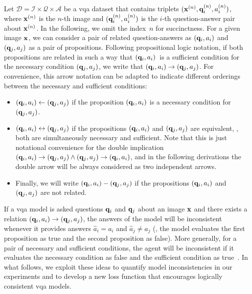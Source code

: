Let $\mathcal{D} = \mathcal{I}\times \mathcal{Q} \times \mathcal{A}$ be a \gls{vqa} dataset that contains triplets $(\mathbf{x}^{(n)}, \mathbf{q}_i^{(n)}, a_i^{(n)})$, where $\mathbf{x}^{(n)}$ is the $n$-th image and $(\mathbf{q}_i^{(n)}, a_i^{(n)})$ is the $i$-th question-answer pair about $\mathbf{x}^{(n)}$. In the following, we omit the index~$n$ for succinctness. For a given image $\mathbf{x}$, we can consider a pair of related question-answers as $(\mathbf{q}_i, a_i)$ and $(\mathbf{q}_j, a_j)$ as a pair of propositions. 
Following propositional logic notation, if both propositions are related in such a way that $(\mathbf{q}_i, a_i)$~is a sufficient condition for the necessary condition $(\mathbf{q}_j, a_j)$, we write that $(\mathbf{q}_i, a_i)\rightarrow (\mathbf{q}_j, a_j)$. For convenience, this arrow notation can be adapted to indicate different orderings between the necessary and sufficient conditions:
\begin{itemize}
    \item $(\mathbf{q}_i, a_i) \leftarrow (\mathbf{q}_j, a_j)$ if the proposition $(\mathbf{q}_i,a_i)$ is a necessary condition for $(\mathbf{q}_j,a_j)$. %
    \item $(\mathbf{q}_i, a_i) \leftrightarrow (\mathbf{q}_j, a_j)$ if the propositions $(\mathbf{q}_i,a_i)$ and $(\mathbf{q}_j,a_j)$ are equivalent, \ie, both are simultaneously necessary and sufficient. Note that this is just notational convenience for the double implication $(\mathbf{q}_i, a_i) \rightarrow (\mathbf{q}_j, a_j) \wedge (\mathbf{q}_j, a_j) \rightarrow (\mathbf{q}_i, a_i)$, and in the following derivations the double arrow will be always considered as two independent arrows.
    \item Finally, we will write $(\mathbf{q}_i, a_i) - (\mathbf{q}_j, a_j)$ if the propositions $(\mathbf{q}_i,a_i)$ and $(\mathbf{q}_j,a_j)$ are not related.
\end{itemize}

If a \gls{vqa} model is asked questions $\mathbf{q}_i$ and $\mathbf{q}_j$ about an image $\mathbf{x}$ and there exists a relation $(\mathbf{q}_i, a_i) \rightarrow (\mathbf{q}_j, a_j)$, the answers of the model will be inconsistent whenever it provides answers $\hat{a}_i = a_i$ and $\hat{a}_j \neq a_j$ (\ie, the model evaluates the first proposition as true and the second proposition as false). More generally, for a pair of necessary and sufficient conditions, the agent will be inconsistent if it evaluates the necessary condition as false and the sufficient condition as true~\cite{bradley1979possible}.
In what follows, we exploit these ideas to quantify model inconsistencies in our experiments and to develop a new loss function that encourages logically consistent \gls{vqa} models.

